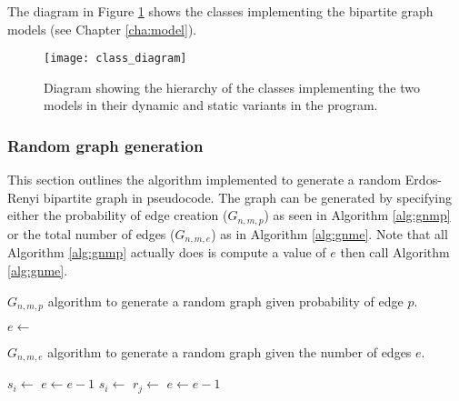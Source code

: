 The diagram in Figure \ref{fig:class-diagram} shows the classes implementing the bipartite graph models (see Chapter \ref{cha:model}).

\begin{figure}
  \centering
  \texttt{[image: class\_diagram]}
  \caption{Diagram showing the hierarchy of the classes implementing the two models in their dynamic and static variants in the \CC{} program.}
  \label{fig:class-diagram}
\end{figure}

\subsubsection{Random graph generation}

This section outlines the algorithm implemented to generate a random Erdos-Renyi bipartite graph \cite{Erdos1960} in pseudocode.
The graph can be generated by specifying either the probability of edge creation ($G_{n,m,p}$) as seen in Algorithm \ref{alg:gnmp} or the total number of edges ($G_{n,m,e}$) as in Algorithm \ref{alg:gnme}.
Note that all Algorithm \ref{alg:gnmp} actually does is compute a value of $e$ then call Algorithm \ref{alg:gnme}.

\begin{algorithm}
  \caption{$G_{n,m,p}$ algorithm to generate a random \nbym{} graph given probability of edge $p$.} \label{alg:gnmp}
\begin{algorithmic}[1]
    \State $e \gets$ 
    \State \Return {}
  \EndProcedure
\end{algorithmic}
\end{algorithm}

\begin{algorithm}
  \caption{$G_{n,m,e}$ algorithm to generate a random \nbym{} graph given the number of edges $e$.} \label{alg:gnme}
  \begin{algorithmic}[1]
          \State $s_i \gets$ 
          \State {}
          \State $e \gets e - 1$
        \EndFor
      \EndIf
        \State $s_i \gets$ 
        \State $r_j \gets$ 
        \State {}
        \State $e \gets e - 1$
      \EndWhile
    \EndProcedure  
  \end{algorithmic}
\end{algorithm}

